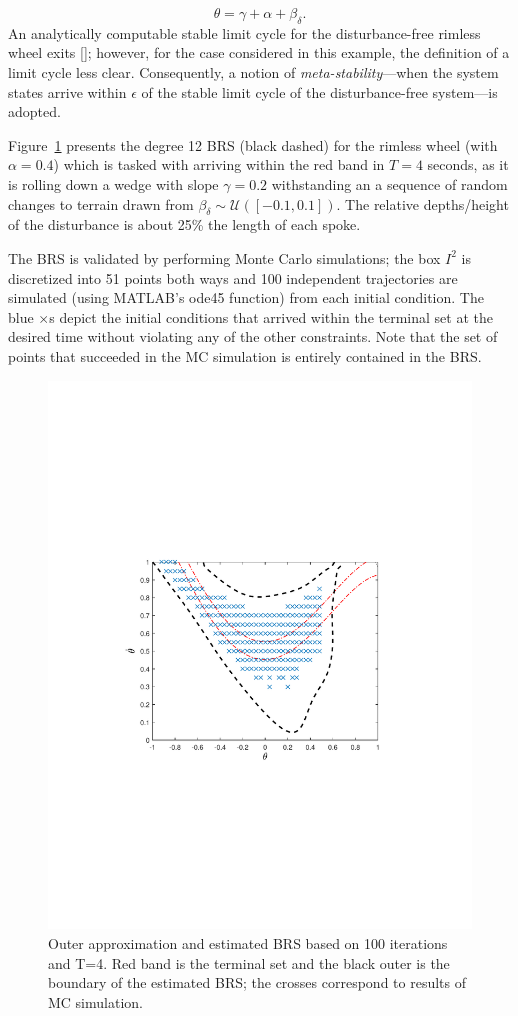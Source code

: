 $$
  \theta=\gamma+\alpha+\beta_\delta.
$$
An analytically computable stable limit cycle for the disturbance-free rimless wheel exits []; however, for the case considered in this example, the definition of a limit cycle less clear. Consequently, a notion of {\em meta-stability}---when the system states arrive within $\epsilon$ of the stable limit cycle of the disturbance-free system---is adopted.
\par
Figure~\ref{fig:rw_brs} presents the degree 12 BRS (black dashed) for the rimless wheel (with $\alpha=0.4$) which is tasked with arriving within the red band in $T=4$ seconds, as it is rolling down a wedge with slope $\gamma=0.2$ withstanding an a sequence of random changes to terrain drawn from $\beta_\delta\sim\mathcal U([-0.1,0.1])$. The relative depths/height of the disturbance is about 25\% the length of each spoke.
\par
The BRS is validated by performing Monte Carlo simulations; the box $I^2$ is discretized into 51 points both ways and 100 independent trajectories are simulated (using MATLAB's ode45 function) from each initial condition. The blue $\times$s depict the initial conditions that arrived within the terminal set at the desired time without violating any of the other constraints. Note that the set of points that succeeded in the MC simulation is entirely contained in the BRS.
\begin{figure}[!t]
  \includegraphics[trim=1.5in 3.3in 1.5in 3.5in, clip=true,width=\columnwidth]{figures/rw_0p1_4}
  \caption{Outer approximation and estimated BRS based on 100 iterations and T=4. Red band is the terminal set and the black outer is the boundary of the estimated BRS; the crosses correspond to results of MC simulation.}
  \label{fig:rw_brs}
\end{figure}
